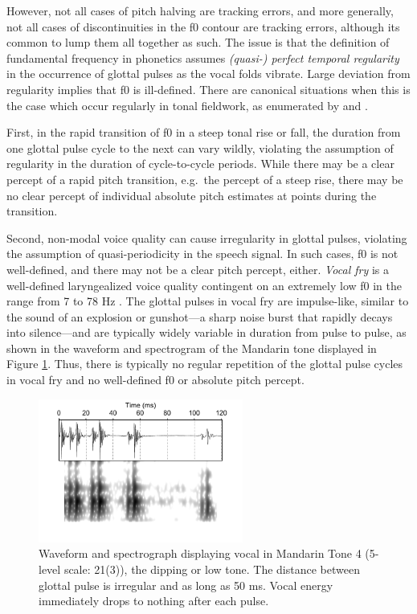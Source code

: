 \documentclass[12pt]{article}
\begin{document}
However, not all cases of pitch
halving are tracking errors, and more generally, not all cases of
discontinuities in the f0 contour are tracking errors, although its
common to lump them all together as such. The issue is that the definition of fundamental frequency in phonetics assumes \textit{(quasi-)
  perfect temporal regularity} in the occurrence of glottal pulses as
the vocal folds vibrate. Large deviation from regularity implies that
f0 is ill-defined. There are canonical situations when this is the
case which occur regularly in tonal fieldwork, as enumerated by  
\citet[p.\ 387]{Pierrehumbert:1990a} and \citet[p.\
500]{Talkin:1995}. 

First, in the rapid transition of f0 in a steep tonal rise or fall, the
duration from one glottal pulse cycle to the next can vary wildly,
violating the assumption of regularity in the duration of
cycle-to-cycle periods. While there may be a clear percept of a rapid
pitch transition, e.g.\ the percept of a steep rise, there may be no clear percept of
individual absolute pitch estimates at points during the transition.  


Second, non-modal voice quality can cause irregularity in glottal
pulses, violating the assumption of quasi-periodicity in the speech
signal. In such cases, f0 is not well-defined, and there may not be a
clear pitch percept, either. \textit{Vocal fry} is a well-defined laryngealized voice
quality contingent on an extremely low f0 in the range from 7 to 78 Hz
\citep{Gerratt:2001}. The glottal pulses in vocal fry are
impulse-like, similar to the sound of an explosion or gunshot---a
sharp noise burst that rapidly decays into silence---and are typically
widely variable in duration from pulse to pulse, as shown in the
waveform and spectrogram of the Mandarin tone displayed in Figure \ref{fig:vf}. Thus, there is
typically no regular repetition of the glottal pulse cycles in vocal
fry and no well-defined f0 or absolute pitch percept.

\begin{figure}
  \centering
  \includegraphics[width=0.6\textwidth]{vf}%
  \caption{Waveform and spectrograph displaying vocal in
    Mandarin Tone 4 (5-level scale: 21(3)), the dipping or low
    tone. The distance between glottal pulse is irregular and as long
    as 50 ms. Vocal energy immediately drops to nothing after each pulse.}
  \label{fig:vf}
\end{figure}
\end{document}
